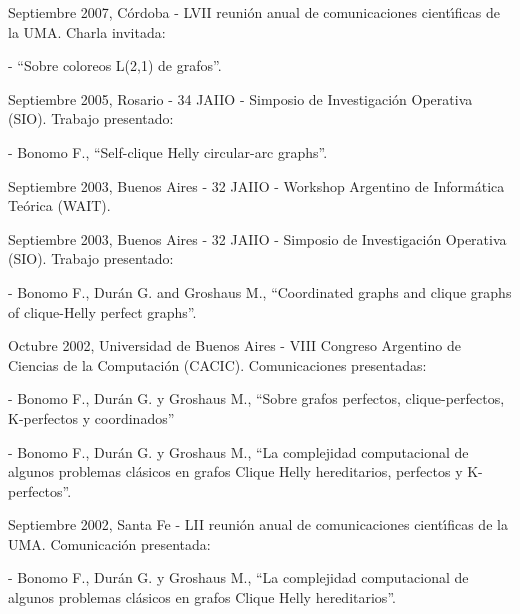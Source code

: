 \begin{compactitem}

\item Septiembre 2007, C\'ordoba - LVII reuni\'on anual de
comunicaciones cient\'{\i}ficas de la UMA. Charla invitada:
\begin{compactitem}
\item[-] ``Sobre coloreos L(2,1) de grafos''.
\end{compactitem}


\item Septiembre 2005, Rosario - 34 JAIIO - Simposio de
Investigaci\'on Ope\-ra\-ti\-va (SIO). Trabajo presentado:
\begin{compactitem}
\item[-] Bonomo F., ``Self-clique Helly circular-arc graphs''.
\end{compactitem}


\smallskip

\item Septiembre 2003, Buenos Aires - 32 JAIIO - Workshop
Argentino de Inform\'atica Te\'orica (WAIT).

\smallskip


\item Septiembre 2003, Buenos Aires - 32 JAIIO - Simposio de
Investigaci\'on Ope\-ra\-ti\-va (SIO). Trabajo presentado:
\begin{compactitem}
\item[-] Bonomo F., Dur\'an G. and Groshaus M., ``Coordinated
graphs and clique graphs of clique-Helly perfect graphs''.
\end{compactitem}


\smallskip

\item Octubre 2002, Universidad de Buenos Aires - VIII Congreso
Argentino de Ciencias de la Computaci\'on (CACIC). Comunicaciones
presentadas:
\begin{compactitem}
\item[-] Bonomo F., Dur\'an G. y Groshaus M., ``Sobre grafos
perfectos, clique-perfectos, K-perfectos y coordinados'' \item[-]
Bonomo F., Dur\'an G. y Groshaus M., ``La complejidad
computacional de algunos problemas cl\'asicos en grafos Clique
Helly hereditarios, perfectos y K-perfectos''.
\end{compactitem}

\smallskip

\item Septiembre 2002, Santa Fe - LII reuni\'on anual de
comunicaciones cient\'{\i}ficas de la UMA. Comunicaci\'on
presentada:
\begin{compactitem}
\item[-] Bonomo F., Dur\'an G. y Groshaus M., ``La complejidad
computacional de algunos problemas cl\'asicos en grafos Clique
Helly hereditarios''.
\end{compactitem}


\end{compactitem}
